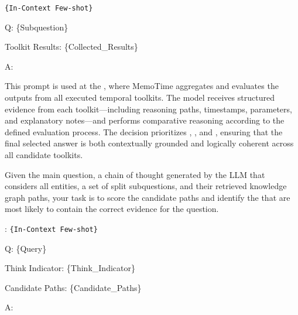 \begin{center}
\begin{minipage}{0.9\columnwidth}
\begin{tcolorbox}[title=Multiple Toolkits Debate–Vote Prompt Template]
\vspace{5pt}
\texttt{\{In-Context Few-shot\}}
\vspace{5pt}

Q: \{Subquestion\}  

Toolkit Results: \{Collected\_Results\}  

A:
    \end{tcolorbox}
    \vspace{2mm}
\end{minipage}
\end{center}

\noindent
This prompt is used at the , where MemoTime aggregates and evaluates the outputs from all executed temporal toolkits.  
The model receives structured evidence from each toolkit—including reasoning paths, timestamps, parameters, and explanatory notes—and performs comparative reasoning according to the defined evaluation process.  
The decision prioritizes , , and , ensuring that the final selected answer is both contextually grounded and logically coherent across all candidate toolkits.
\vspace{3mm}

\begin{center}
\begin{minipage}{0.9\columnwidth}
    \centering
    \begin{tcolorbox}[title=LLM-aware Selection Prompt Template]
        \small
Given the main question, a chain of thought generated by the LLM that considers all entities, a set of split subquestions, and their retrieved knowledge graph paths, your task is to score the candidate paths and identify the  that are most likely to contain the correct evidence for the question.

\vspace{5pt}
:
\texttt{\{In-Context Few-shot\}}
\vspace{5pt}

Q: \{Query\}

Think Indicator: \{Think\_Indicator\}

Candidate Paths: \{Candidate\_Paths\}

A:
    \end{tcolorbox}
\end{minipage}
\end{center}
\vspace{3mm}

